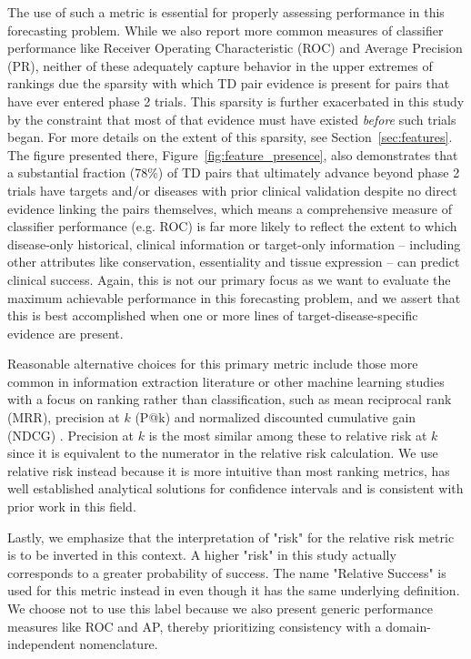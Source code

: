 \documentclass{article}
\begin{document}
The use of such a metric is essential for properly assessing performance in this forecasting problem. While we also report more common measures of classifier performance like Receiver Operating Characteristic (ROC) and Average Precision (PR), neither of these adequately capture behavior in the upper extremes of rankings due the sparsity with which TD pair evidence is present for pairs that have ever entered phase 2 trials. This sparsity is further exacerbated in this study by the constraint that most of that evidence must have existed \textit{before} such trials began. For more details on the extent of this sparsity, see Section~\ref{sec:features}. The figure presented there, Figure~\ref{fig:feature_presence}, also demonstrates that a substantial fraction (78\%) of TD pairs that ultimately advance beyond phase 2 trials have targets and/or diseases with prior clinical validation despite no direct evidence linking the pairs themselves, which means a comprehensive measure of classifier performance (e.g. ROC) is far more likely to reflect the extent to which disease-only historical, clinical information or target-only information -- including other attributes like conservation, essentiality and tissue expression -- can predict clinical success. Again, this is not our primary focus as we want to evaluate the maximum achievable performance in this forecasting problem, and we assert that this is best accomplished when one or more lines of target-disease-specific evidence are present.

Reasonable alternative choices for this primary metric include those more common in information extraction literature or other machine learning studies with a focus on ranking rather than classification, such as mean reciprocal rank (MRR), precision at $k$ (P@k) and normalized discounted cumulative gain (NDCG) \cite{hoyt2022unified,moffat2022batch}. Precision at $k$ is the most similar among these to relative risk at $k$ since it is equivalent to the numerator in the relative risk calculation. We use relative risk instead because it is more intuitive than most ranking metrics, has well established analytical solutions for confidence intervals \cite{Katz1978-mo} and is consistent with prior work in this field.

Lastly, we emphasize that the interpretation of "risk" for the relative risk metric is to be inverted in this context. A higher "risk" in this study actually corresponds to a greater probability of success. The name "Relative Success" is used for this metric instead in \cite{Minikel2023.06.23.23291765} even though it has the same underlying definition. We choose not to use this label because we also present generic performance measures like ROC and AP, thereby prioritizing consistency with a domain-independent nomenclature.
\end{document}
